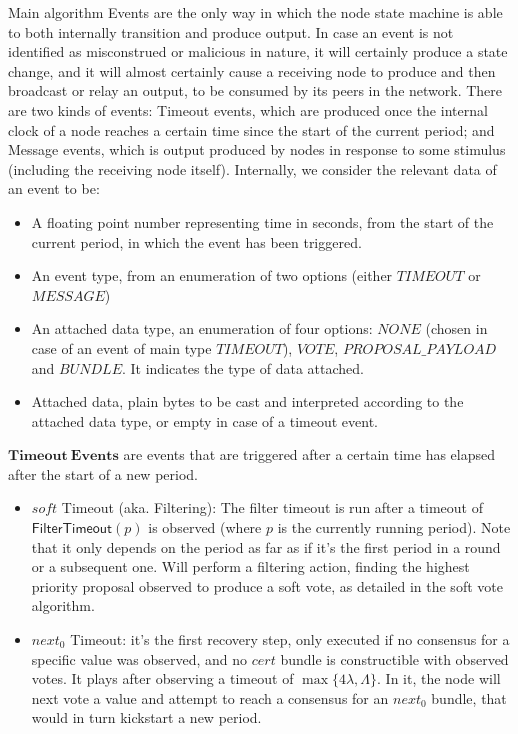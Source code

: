 \documentclass[10pt,a4paper]{article}
\begin{document}
\begin{section}{Main algorithm}
\medskip
Events are the only way in which the node state machine is able to both internally transition and produce output.
In case an event is not identified as misconstrued or malicious in nature, it will certainly produce a state change,
and it will almost certainly cause a receiving node to produce and then broadcast or relay an output, to be consumed
by its peers in the network.
There are two kinds of events: Timeout events, which are produced once the internal clock of a node reaches a certain
time since the start of the current period; and Message events, which is output produced by nodes in response to some stimulus
(including the receiving node itself).
Internally, we consider the relevant data of an event to be:
\begin{itemize}
    \item A floating point number representing time in seconds, from the start of the current period, in which the event
    has been triggered.
    \item An event type, from an enumeration of two options (either $TIMEOUT$ or $MESSAGE$)
    \item An attached data type, an enumeration of four options: $NONE$ (chosen in case of an event of main type $TIMEOUT$), 
    $VOTE$, $PROPOSAL\_PAYLOAD$ and $BUNDLE$. It indicates the type of data attached.
    \item Attached data, plain bytes to be cast and interpreted according to the attached data type, or empty in case of a
    timeout event.
\end{itemize}

$\mathbf{Timeout \ Events}$ are events that are triggered after a certain time has elapsed after the start of a new period.
\begin{itemize}
    \item $soft$ Timeout (aka. Filtering): The filter timeout is run after a timeout of $\mathsf{FilterTimeout}(p)$ is observed 
    (where $p$ is the currently running period). Note that it only depends on the period as far as if it's the first
    period in a round or a subsequent one.
    Will perform a filtering action, finding the highest priority proposal observed to produce a soft vote, as detailed
    in the soft vote algorithm.

    \item $next_0$ Timeout: it's the first recovery step, only executed if no consensus for a specific value was observed,
    and no $cert$ bundle is constructible with observed votes. It plays after observing a timeout of $\max\{4\lambda, \Lambda \}$.
    In it, the node will next vote a value and attempt to reach a consensus for an $next_0$ bundle, that would in turn kickstart
    a new period.


\end{itemize}
\end{section}
\end{document}
